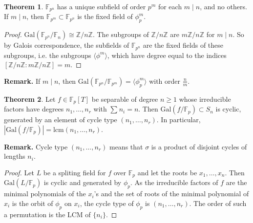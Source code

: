 \documentclass{article}
\theoremstyle{definition}
\newtheorem{theorem}{Theorem}[section]
\begin{document}
\begin{theorem}
    $\mathbb{F}_{p^n}$ has a unique subfield of order $p^m$ for each $m \mid n$, and no others. If $m \mid n$, then $\mathbb{F}_{p^m} \subset \mathbb{F}_{p^n}$ is the fixed field of $\phi_p^m$.
\end{theorem}
\begin{proof}
    $\text{Gal}(\mathbb{F}_{p^n}/\mathbb{F}_n) \cong \mathbb{Z}/n\mathbb{Z}$. The subgroups of $\mathbb{Z}/n\mathbb{Z}$ are $m\mathbb{Z}/n\mathbb{Z}$ for $m \mid n$. So by Galois correspondence, the subfields of $\mathbb{F}_{p^n}$ are the fixed fields of these subgroups, i.e. the subgroups $\langle\phi^m \rangle$, which have degree equal to the indices $[\mathbb{Z}/n\mathbb{Z} : m \mathbb{Z}/ n\mathbb{Z}] = m$.
\end{proof}
\textbf{Remark.} If $m \mid n$, then $\text{Gal}(\mathbb{F}_{p^n}/\mathbb{F}_{p^m}) = \langle \phi_p^m\rangle$ with order $\frac{n}{m}$.
\begin{theorem}\label{10.4}
    Let $f \in \mathbb{F}_p[T]$ be separable of degree $n\ge 1$ whose irreducible factors have degrees $n_1,\ldots,n_r$ with $\sum_{}^{} n_i =n$. Then $\text{Gal}(f/\mathbb{F}_p) \subset S_n$ is cyclic, generated by an element of cycle type $(n_1,\ldots,n_r)$. In particular, $|\text{Gal}(f/\mathbb{F}_p)|=\text{lcm}(n_1,\ldots,n_r)$.
\end{theorem}
\textbf{Remark.} Cycle type $(n_1,\ldots,n_r)$ means that $\sigma$ is a product of disjoint cycles of lengths $n_i$.
\begin{proof}
    Let $L$ be a spliting field for $f$ over $\mathbb{F}_p$ and let the roots be $x_1,\ldots,x_n$. Then $\text{Gal}(L/\mathbb{F}_p)$ is cyclic and generated by $\phi_p$. As the irreducible factors of $f$ are the minimal polynomials of the $x_i$'s and the set of roots of the minimal polynomial of $x_i$ is the orbit of $\phi_p$ on $x_i$, the cycle type of $\phi_p$ is $(n_1,\ldots,n_r)$. The order of such a permutation is the LCM of $\{n_i\}$.
\end{proof}

\end{document}
